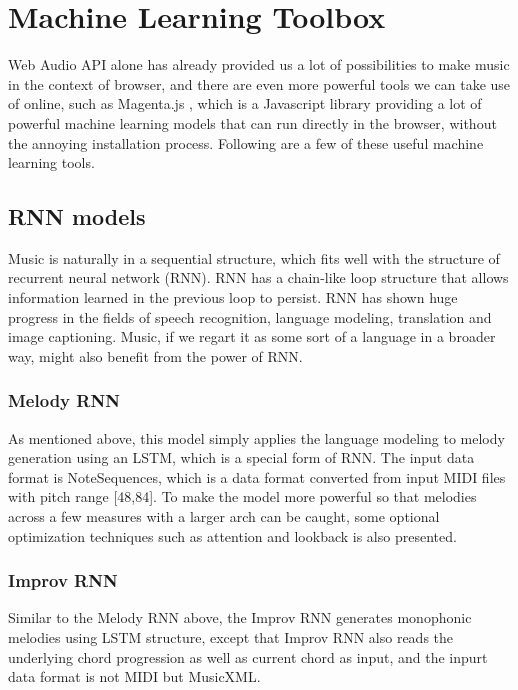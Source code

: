 \documentclass[man]{apa6}
\begin{document}
\section{Machine Learning Toolbox}

Web Audio API alone has already provided us a lot of possibilities to make music in the context of browser, and there are even more powerful tools we can take use of online, such as Magenta.js \parencite{magentajs}, which is a Javascript library providing a lot of powerful machine learning models that can run directly in the browser, without the annoying installation process. Following are a few of these useful machine learning tools.

\subsection{RNN models}
Music is naturally in a sequential structure, which fits well with the structure of recurrent neural network (RNN). RNN has a chain-like loop structure that allows information learned in the previous loop to persist. RNN has shown huge progress in the fields of speech recognition, language modeling, translation and image captioning. Music, if we regart it as some sort of a language in a broader way, might also benefit from the power of RNN.

\subsubsection{Melody RNN}
As mentioned above, this model simply applies the language modeling to melody generation using an LSTM, which is a special form of RNN. The input data format is NoteSequences, which is a data format converted from input MIDI files with pitch range [48,84]. To make the model more powerful so that melodies across a few measures with a larger arch can be caught, some optional optimization techniques such as attention and lookback is also presented.

\subsubsection{Improv RNN}
Similar to the Melody RNN above, the Improv RNN generates monophonic melodies using LSTM structure, except that Improv RNN also reads the underlying chord progression as well as current chord as input, and the inpurt data format is not MIDI but MusicXML.
\end{document}
